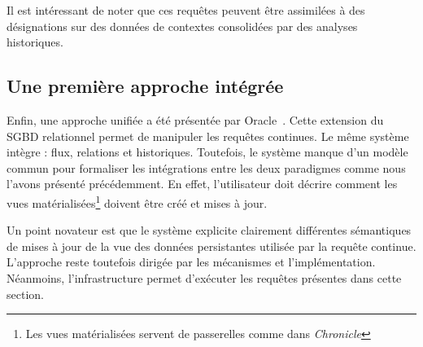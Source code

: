 Il est intéressant de noter que ces requêtes peuvent être assimilées à des désignations sur des données de contextes consolidées par des analyses historiques.

\subsection{Une première approche intégrée}
Enfin, une approche unifiée a été présentée par Oracle~\cite{Witkowski:oraclecq}. Cette extension du SGBD relationnel permet de manipuler les requêtes continues. Le même système intègre : flux, relations et historiques. Toutefois, le système manque d'un modèle commun pour formaliser les intégrations entre les deux paradigmes comme nous l'avons présenté précédemment. En effet, l'utilisateur doit décrire comment les vues matérialisées\footnote{Les vues matérialisées servent de passerelles comme dans \textit{Chronicle}} doivent être créé et mises à jour. 

Un point novateur est que le système explicite clairement différentes sémantiques de mises à jour de la vue des données persistantes utilisée par la requête continue. L'approche reste toutefois dirigée par les mécanismes et l'implémentation. Néanmoins, l'infrastructure permet d'exécuter les requêtes présentes dans cette section.
